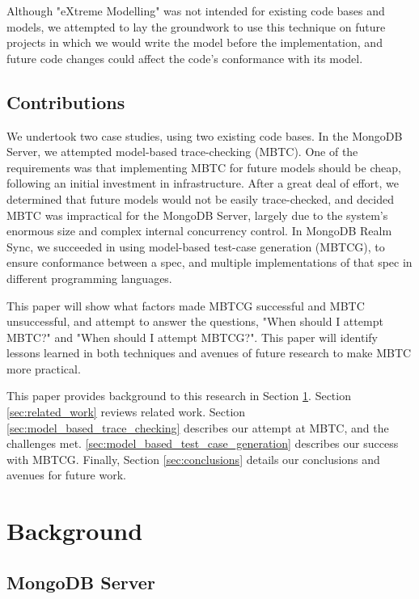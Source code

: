\documentclass{vldb}
\begin{document}
Although "eXtreme Modelling" was not intended for existing code bases and models, we attempted to lay the groundwork to use this technique on future projects in which we would write the model before the implementation, and future code changes could affect the code's conformance with its model.

\subsection{Contributions}

We undertook two case studies, using two existing code bases.
In the MongoDB Server, we attempted model-based trace-checking (MBTC). 
One of the requirements was that implementing MBTC for future models should be cheap, following an initial investment in infrastructure.
After a great deal of effort, we determined that future models would not be easily trace-checked, and decided MBTC was impractical for the MongoDB Server, largely due to the system's enormous size and complex internal concurrency control.
In MongoDB Realm Sync, we succeeded in using model-based test-case generation (MBTCG), to ensure conformance between a spec, and multiple implementations of that spec in different programming languages.

This paper will show what factors made MBTCG successful and MBTC unsuccessful, and attempt to answer the questions, "When should I attempt MBTC?" and "When should I attempt MBTCG?".
This paper will identify lessons learned in both techniques and avenues of future research to make MBTC more practical.

This paper provides background to this research in Section \ref{sec:background}. 
Section \ref{sec:related_work} reviews related work. 
Section \ref{sec:model_based_trace_checking} describes our attempt at MBTC, and the challenges met. 
\ref{sec:model_based_test_case_generation} describes our success with MBTCG. 
Finally, Section \ref{sec:conclusions} details our conclusions and avenues for future work.

\section{Background}
\label{sec:background}

\subsection{MongoDB Server}
\label{subsec:background_server}
\end{document}
